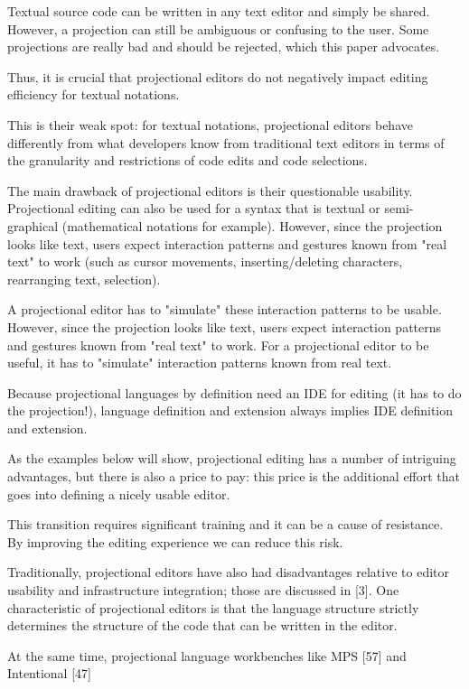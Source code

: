 Textual source code can be written in any text editor and simply be shared.
However, a projection can still be ambiguous or confusing to the user.
Some projections are really bad and should be rejected, which this paper advocates.

Thus, it is crucial that projectional editors do not negatively impact editing efficiency for textual notations.

This is their weak spot: for textual notations, projectional editors behave differently from what developers know from traditional text editors in terms of the granularity and restrictions of code edits and code selections.

The main drawback of projectional editors is their questionable usability.
Projectional editing can also be used for a syntax that is textual or semi-graphical (mathematical notations for example).
However, since the projection looks like text, users expect interaction patterns and gestures known from "real text" to work (such as cursor movements, inserting/deleting characters, rearranging text, selection).

A projectional editor has to "simulate" these interaction patterns to be usable. 
However, since the projection looks like text, users expect interaction patterns and gestures known from "real text" to work.
For a projectional editor to be useful, it has to "simulate" interaction patterns known from real text.


Because projectional languages by definition need an IDE for editing (it has to do the projection!), language definition and extension always implies IDE definition and extension.


As the examples below will show, projectional editing has a number of intriguing advantages, but there is also a price to pay: this price is the additional effort that goes into defining a nicely usable editor.

This transition requires significant training and it can be a cause of resistance.
By improving the editing experience we can reduce this risk.



Traditionally, projectional editors have also had disadvantages relative to editor usability and infrastructure integration; those are discussed in [3].
One characteristic of projectional editors is that the language structure strictly determines the structure of the code that can be written in the editor.


At the same time, projectional language workbenches like MPS [57] and Intentional [47]


